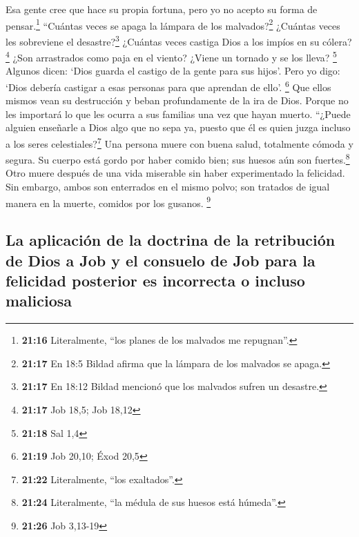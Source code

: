  Esa gente cree que hace su propia fortuna, pero yo no
acepto su forma de pensar.\footnote{\textbf{21:16} Literalmente, ``los
  planes de los malvados me repugnan''.}  ``Cuántas veces
se apaga la lámpara de los malvados?\footnote{\textbf{21:17} En 18:5
  Bildad afirma que la lámpara de los malvados se apaga.} ¿Cuántas veces
les sobreviene el desastre?\footnote{\textbf{21:17} En 18:12 Bildad
  mencionó que los malvados sufren un desastre.} ¿Cuántas veces castiga
Dios a los impíos en su cólera? \footnote{\textbf{21:17} Job 18,5; Job
  18,12}  ¿Son arrastrados como paja en el viento? ¿Viene
un tornado y se los lleva? \footnote{\textbf{21:18} Sal 1,4}
 Algunos dicen: `Dios guarda el castigo de la gente para
sus hijos'. Pero yo digo: `Dios debería castigar a esas personas para
que aprendan de ello'. \footnote{\textbf{21:19} Job 20,10; Éxod 20,5}
 Que ellos mismos vean su destrucción y beban
profundamente de la ira de Dios.  Porque no les importará
lo que les ocurra a sus familias una vez que hayan muerto.
 ``¿Puede alguien enseñarle a Dios algo que no sepa ya,
puesto que él es quien juzga incluso a los seres celestiales?\footnote{\textbf{21:22}
  Literalmente, ``los exaltados''.}  Una persona muere
con buena salud, totalmente cómoda y segura.  Su cuerpo
está gordo por haber comido bien; sus huesos aún son fuertes.\footnote{\textbf{21:24}
  Literalmente, ``la médula de sus huesos está húmeda''.}
 Otro muere después de una vida miserable sin haber
experimentado la felicidad.  Sin embargo, ambos son
enterrados en el mismo polvo; son tratados de igual manera en la muerte,
comidos por los gusanos. \footnote{\textbf{21:26} Job 3,13-19}

\hypertarget{la-aplicaciuxf3n-de-la-doctrina-de-la-retribuciuxf3n-de-dios-a-job-y-el-consuelo-de-job-para-la-felicidad-posterior-es-incorrecta-o-incluso-maliciosa}{%
\subsection{La aplicación de la doctrina de la retribución de Dios a Job
y el consuelo de Job para la felicidad posterior es incorrecta o incluso
maliciosa}\label{la-aplicaciuxf3n-de-la-doctrina-de-la-retribuciuxf3n-de-dios-a-job-y-el-consuelo-de-job-para-la-felicidad-posterior-es-incorrecta-o-incluso-maliciosa}}

